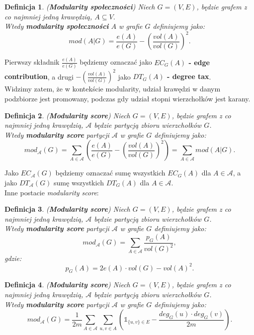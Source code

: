 \documentclass[letterpaper,12pt]{article}
\newtheorem{definition}{Definicja}
\begin{document}
  \begin{definition}
    (\textbf{Modularity społeczności}) Niech \(G = (V, E)\), będzie grafem z co najmniej jedną krawędzią, \(A \subseteq V\).\\
    Wtedy \textbf{modularity społeczności} \(A\) w grafie \(G\) definiujemy jako:
    \[
    mod(A|G) = \frac{e(A)}{e(G)} - {\left(\frac{vol(A)}{vol(G)}\right)}^2.
    \]
  \end{definition}
  Pierwszy składnik \(\frac{e(A)}{e(G)}\) będziemy oznaczać jako \textbf{\(EC_G(A)\) - edge contribution}, a drugi \(- {\left(\frac{vol(A)}{vol(G)}\right)}^2\) jako \textbf{\(DT_G(A)\) -  degree tax}.\\

  Widzimy zatem, że w kontekście modularity, udział krawędzi w danym podzbiorze jest promowany, podczas gdy udział stopni wierzchołków jest karany.\\

  \begin{definition}
    (\textbf{Modularity score}) Niech \(G = (V, E)\), będzie grafem z co najmniej jedną krawędzią, \(\mathcal{A}\) będzie partycją zbioru wierzchołków \(G\).\\
    Wtedy \textbf{modularity score} partycji \(\mathcal{A}\) w grafie \(G\) definiujemy jako:
    \[
    mod_{\mathcal{A}}(G) = \sum_{A \in \mathcal{A}} \left(\frac{e(A)}{e(G)} - {\left(\frac{vol(A)}{vol(G)}\right)}^2\right) = \sum_{A \in \mathcal{A}} mod(A|G).
    \]
  \end{definition}
  Jako \textbf{\(EC_{\mathcal{A}}(G)\)} będziemy oznaczać sumę wszystkich \(EC_G(A)\) dla \(A \in \mathcal{A}\), a jako \textbf{\(DT_{\mathcal{A}}(G)\)} sumę wszystkich \(DT_G(A)\) dla \(A \in \mathcal{A}\).\\

  Inne postacie \textit{modularity score}:
  \begin{definition}
    (\textbf{Modularity score}) Niech \(G = (V, E)\), będzie grafem z co najmniej jedną krawędzią, \(\mathcal{A}\) będzie partycją zbioru wierzchołków \(G\).\\
    Wtedy \textbf{modularity score} partycji \(\mathcal{A}\) w grafie \(G\) definiujemy jako:
    \[mod_{\mathcal{A}}(G) = \sum_{A \in \mathcal{A}} \frac{p_G(A)}{vol(G)^2},\]
    gdzie:
    \[p_G(A) = 2e(A) \cdot vol(G) - {vol(A)}^2.\]
  \end{definition}

  \begin{definition}
    (\textbf{Modularity score}) Niech \(G = (V, E)\), będzie grafem z co najmniej jedną krawędzią, \(\mathcal{A}\) będzie partycją zbioru wierzchołków \(G\).\\
    Wtedy \textbf{modularity score} partycji \(\mathcal{A}\) w grafie \(G\) definiujemy jako:
    \[mod_{\mathcal{A}}(G) = \frac{1}{2m}\sum_{A \in \mathcal{A}} \sum_{u,v \in A} \left( \mathbb{1}_{\{u,v\} \in E} - \frac{deg_G(u) \cdot deg_G(v)}{2m}\right).\]
  \end{definition}
\end{document}
